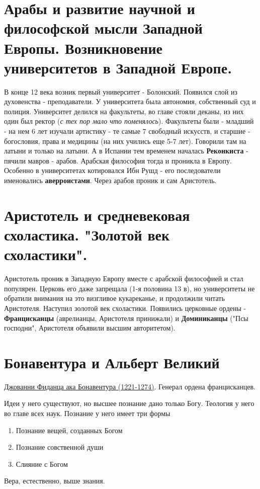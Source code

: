 \documentclass[12pt,a4paper]{article}
\begin{document}
\section{Арабы и развитие научной и философской мысли Западной Европы. Возникновение университетов в Западной Европе.}
В конце 12 века возник первый университет - Болонский. Появился слой из духовенства - преподаватели. У университета была автономия, собственный суд и полиция. Университет делился на факультеты, во главе стояли деканы, из них один был ректор (\textit{с тех пор мало что поменялось}). Факультеты были - младший - на нем 6 лет изучали артистику - те самые 7 свободный искусств, и старшие - богословия, права и медицины (на них учились еще 5-7 лет). Говорили там на латыни и только на латыни. 
А в Испании тем временем началась \textbf{Реконкиста} - пячили мавров - арабов. Арабская философия тогда и проникла в Европу. Особенно в университетах котировался Ибн Рушд - его последователи именовались \textbf{аверроистами}. Через арабов проник и сам Аристотель.

\section{Аристотель и средневековая схоластика. "Золотой век схоластики".}
Аристотель проник в Западную Европу вместе с арабской философией и стал популярен. Церковь его даже запрещала (1-я половина 13 в), но университеты не обратили внимания на это визгливое кукареканье, и продолжили читать Аристотеля. Наступил золотой век схоластики. Появились церковные ордены - \textbf{Францисканцы} (аврелианцы, Аристотеля принижали) и \textbf{Доминиканцы} ("Псы господни", Аристотеля объявили высшим авторитетом).

\section{Бонавентура и Альберт Великий}
\hspace{8pt} 
\underline{Джованни Фиданца ака Бонавентура (1221-1274)}. Генерал ордена францисканцев. 

Идеи у него существуют, но высшее познание дано только Богу. Теология у него во главе всех наук. Познание у него имеет три формы
\begin{enumerate}
\item Познание вещей, созданных Богом
\item Познание совственной души
\item Слияние с Богом
\end{enumerate}
Вера, естественно, выше знания.
\end{document}
